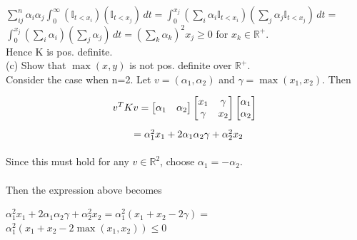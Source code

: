 \documentclass[18pt]{article}
\begin{document}
\begin{flushleft}
\vspace{.4cm}
$\sum_{ij}^n \alpha_i \alpha_j \int_{0}^{\infty} (\mathbb{I}_{t<x_i}) (\mathbb{I}_{t<x_j}) \,dt=\int_{0}^{x_j} (\sum_i \alpha_i \mathbb{I}_{t<x_i}) (\sum_j \alpha_j \mathbb{I}_{t<x_j}) \,dt=$\\
$\int_0^{x_j} (\sum_i \alpha_i)(\sum_j \alpha_j) \,dt=(\sum_k \alpha_k)^2 x_j \geq 0$ for $x_k \in \mathbb{R}^{+}$.\\
\vspace{.4cm}
Hence K is pos. definite.\\
\vspace{.4cm}
(c) Show that $\max(x,y)$ is not pos. definite over $\mathbb{R}^{+}$.\\
\vspace{.4cm}
Consider the case when n=2. Let $v=(\alpha_1,\alpha_2)$ and $\gamma=\max(x_1,x_2)$. Then\\
\end{flushleft}
$$ v^T K v=
\begin{bmatrix} \alpha_1 & \alpha_2 \end{bmatrix}
    \begin{bmatrix} x_1 & \gamma\\
                    \gamma & x_2 \end{bmatrix}
\begin{bmatrix} \alpha_1 \\ \alpha_2 \end{bmatrix}\\
$$
$\hspace{4.5cm} =\alpha_1^2 x_1 + 2 \alpha_1 \alpha_2 \gamma + \alpha_2^2 x_2$\\
\vspace{.4cm}
\\
Since this must hold for any $v \in \mathbb{R}^2$, choose $\alpha_1=-\alpha_2$.\\
\\
Then the expression above becomes\\
\begin{flushleft}
$\alpha_1^2 x_1 + 2 \alpha_1 \alpha_2 \gamma + \alpha_2^2 x_2 = \alpha_1^2 (x_1 + x_2 -2\gamma)=$\\
$\alpha_1^2(x_1+x_2-2 \max(x_1,x_2)) \leq 0$
\end{flushleft}
\end{document}

